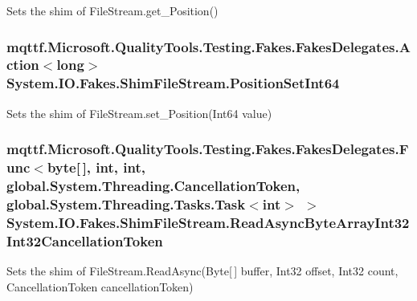 Sets the shim of File\-Stream.\-get\-\_\-\-Position()

\hypertarget{class_system_1_1_i_o_1_1_fakes_1_1_shim_file_stream_abe8c2681805fe704111c9ddc99c83fc7}{
\subsubsection[{Position\-Set\-Int64}]{\setlength{\rightskip}{0pt plus 5cm}mqttf.\-Microsoft.\-Quality\-Tools.\-Testing.\-Fakes.\-Fakes\-Delegates.\-Action$<$long$>$ System.\-I\-O.\-Fakes.\-Shim\-File\-Stream.\-Position\-Set\-Int64\hspace{0.3cm}{\ttfamily [set]}}}\label{class_system_1_1_i_o_1_1_fakes_1_1_shim_file_stream_abe8c2681805fe704111c9ddc99c83fc7}


Sets the shim of File\-Stream.\-set\-\_\-\-Position(\-Int64 value)

\hypertarget{class_system_1_1_i_o_1_1_fakes_1_1_shim_file_stream_a4e694267e31b0e4fecc754ecca5dd198}{
\subsubsection[{Read\-Async\-Byte\-Array\-Int32\-Int32\-Cancellation\-Token}]{\setlength{\rightskip}{0pt plus 5cm}mqttf.\-Microsoft.\-Quality\-Tools.\-Testing.\-Fakes.\-Fakes\-Delegates.\-Func$<$byte\mbox{[}$\,$\mbox{]}, int, int, global.\-System.\-Threading.\-Cancellation\-Token, global.\-System.\-Threading.\-Tasks.\-Task$<$int$>$ $>$ System.\-I\-O.\-Fakes.\-Shim\-File\-Stream.\-Read\-Async\-Byte\-Array\-Int32\-Int32\-Cancellation\-Token\hspace{0.3cm}{\ttfamily [set]}}}\label{class_system_1_1_i_o_1_1_fakes_1_1_shim_file_stream_a4e694267e31b0e4fecc754ecca5dd198}


Sets the shim of File\-Stream.\-Read\-Async(\-Byte\mbox{[}$\,$\mbox{]} buffer, Int32 offset, Int32 count, Cancellation\-Token cancellation\-Token)

